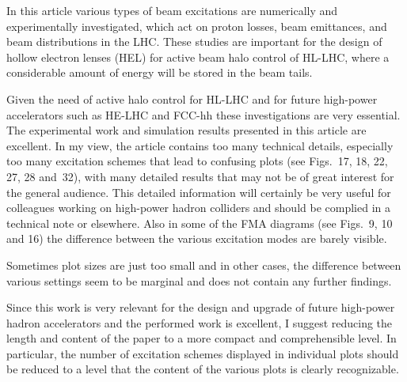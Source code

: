 \documentclass[aps
,prstab
,preprint,tightenlines
,amsfonts,amssymb,amsmath
]{revtex4-1}
\newenvironment{co}{\em}{}
\newcommand{\bco}{\begin{co}}
\newcommand{\eco}{\end{co}}
\begin{document}
\bco

  In this article various types of beam excitations are numerically
  and experimentally investigated, which act on proton losses, beam
  emittances, and beam distributions in the LHC. These studies are
  important for the design of hollow electron lenses (HEL) for active
  beam halo control of HL-LHC, where a considerable amount of energy
  will be stored in the beam tails.

  Given the need of active halo control for HL-LHC and for future
  high-power accelerators such as HE-LHC and FCC-hh these
  investigations are very essential. The experimental work and
  simulation results presented in this article are excellent. In my
  view, the article contains too many technical details, especially
  too many excitation schemes that lead to confusing plots (see
  Figs.~17, 18, 22, 27, 28 and~32), with many detailed results that
  may not be of great interest for the general audience. This detailed
  information will certainly be very useful for colleagues working on
  high-power hadron colliders and should be complied in a technical
  note or elsewhere. Also in some of the FMA diagrams (see Figs.~9, 10
  and 16) the difference between the various excitation modes are
  barely visible.

  Sometimes plot sizes are just too small and in other cases, the
  difference between various settings seem to be marginal and does not
  contain any further findings.

  Since this work is very relevant for the design and upgrade of
  future high-power hadron accelerators and the performed work is
  excellent, I suggest reducing the length and content of the paper to
  a more compact and comprehensible level. In particular, the number
  of excitation schemes displayed in individual plots should be
  reduced to a level that the content of the various plots is clearly
  recognizable.
\eco
\end{document}
